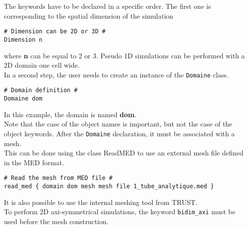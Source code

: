 The keywords have to be declared in a specific order. The first one is corresponding to the spatial dimension of the simulation
\begin{lstlisting}
# Dimension can be 2D or 3D #
Dimension n
\end{lstlisting}
where \textbf{n} can be equal to 2 or 3. Pseudo 1D simulations can be performed with a 2D domain one cell wide.\\
In a second step, the user needs to create an instance of the \texttt{Domaine} class.
\begin{lstlisting}
# Domain definition #
Domaine dom
\end{lstlisting}
In this example, the domain is named \textbf{dom}. \\
Note that the case of the object names is important, but not the case of the object keywords. 
After the \texttt{Domaine} declaration, it must be associated with a mesh. \\
This can be done using the class Read\textunderscore MED to use an external mesh file defined in the MED format. 
\begin{lstlisting}
# Read the mesh from MED file #
read_med { domain dom mesh mesh file 1_tube_analytique.med }
\end{lstlisting}
It is also possible to use the internal meshing tool from TRUST.\\
To perform 2D axi-symmetrical simulations, the keyword \texttt{bidim\_axi} must be used before the mesh construction. 

